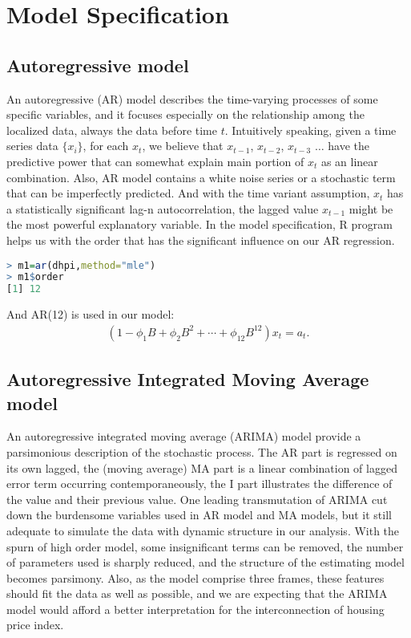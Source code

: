 \documentclass[12pt,letterpaper]{article}
\begin{document}
\section{Model Specification}
\subsection{Autoregressive model}
An autoregressive (AR) model describes the time-varying processes of some specific variables, and it focuses especially on the relationship among the localized data, always the data before time $t$. 
Intuitively speaking, given a time series data $ \{x_i\}$, for each $x_t$, we believe that $x_{t-1}$, $x_{t-2}$, $x_{t-3}$ $\dots$ have the predictive power that can somewhat explain main portion of $x_t$ as an linear combination.
Also, AR model contains a white noise series or a stochastic term that can be imperfectly predicted.
And with the time variant assumption, $x_t$ has a statistically significant lag-n autocorrelation, the lagged value $x_{t-1}$ might be the most powerful explanatory variable.
In the model specification, R program helps us with the order that has the significant influence on our AR regression.

{\footnotesize
\begin{lstlisting}[language=R]
> m1=ar(dhpi,method="mle")
> m1$order
[1] 12
\end{lstlisting}
}

And AR(12) is used in our model:
\begin{equation}
\begin{aligned}
(1-\phi_1B+\phi_2B^2+ \cdots + \phi_{12}B^{12})x_t=a_t.
\end{aligned}
\end{equation}

\subsection{Autoregressive Integrated Moving Average model}
An autoregressive integrated moving average (ARIMA) model provide a parsimonious description of the stochastic process. 
The AR part is regressed on its own lagged, the (moving average) MA part is a linear combination of lagged error term occurring contemporaneously, the I part illustrates the difference of the value and their previous value. 
One leading transmutation of ARIMA cut down the burdensome variables used in AR model and MA models, but it still adequate to simulate the data with dynamic structure in our analysis.
With the spurn of high order model, some insignificant terms can be removed, the number of parameters used is sharply reduced, and the structure of the estimating model becomes parsimony.
Also, as the model comprise three frames, these features should fit the data as well as possible, and we are expecting that the ARIMA model would afford a better interpretation for the interconnection of housing price index.
\end{document}
